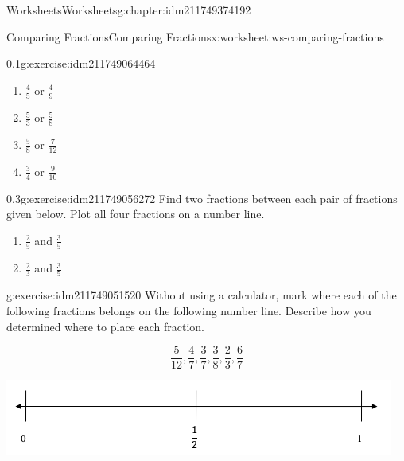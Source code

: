 \documentclass[twoside,11pt,]{book}
\begin{document}
\begin{chapterptx}{Worksheets}{}{Worksheets}{}{}{g:chapter:idm211749374192}
\begin{worksheet-section-numberless}{Comparing Fractions}{}{Comparing Fractions}{}{}{x:worksheet:ws-comparing-fractions}
\begin{divisionexercise}{3}{}{0.1}{g:exercise:idm211749064464}
%
\begin{enumerate}[label=(\alph*)]
\item{}\(\frac{4}{5} \) or \(\frac{4}{9} \)%
\item{}\(\frac{5}{3} \) or \(\frac{5}{8} \)%
\item{}\(\frac{5}{8} \) or \(\frac{7}{12} \)%
\item{}\(\frac{3}{4} \) or \(\frac{9}{10} \)%
\end{enumerate}
\end{divisionexercise}%
\clearpage
\begin{divisionexercise}{4}{}{0.3}{g:exercise:idm211749056272}%
Find two fractions between each pair of fractions given below. Plot all four fractions on a number line.%
%
\begin{enumerate}[label=(\alph*)]
\item{}\(\frac{2}{5} \) and \(\frac{3}{5} \)%
\item{}\(\frac{2}{3} \) and \(\frac{3}{5} \)%
\end{enumerate}
\end{divisionexercise}%
\begin{divisionexercise}{5}{}{}{g:exercise:idm211749051520}%
Without using a calculator, mark where each of the following fractions belongs on the following number line. Describe how you determined where to place each fraction.%
\par
%
\begin{equation*}
\frac{5}{12} , \frac{4}{7} , \frac{3}{7} , \frac{3}{8} , \frac{2}{3} , \frac{6}{7} 
\end{equation*}
%
\begin{sidebyside}{1}{0.05}{0.05}{0}%
\begin{sbspanel}{0.9}%
\includegraphics[width=1\linewidth]{images/number-line-half-one.png}
\end{sbspanel}%
\end{sidebyside}%
\end{divisionexercise}%
\end{worksheet-section-numberless}
\restoregeometry
%
%
\typeout{************************************************}
\typeout{************************************************}
%

\end{chapterptx}
\end{document}
